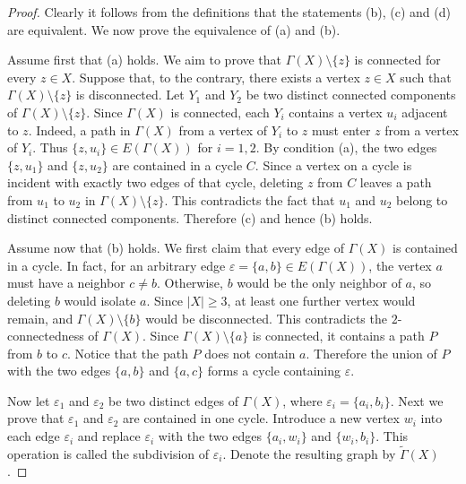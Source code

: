 \documentclass[reqno]{amsart}
\numberwithin{equation}{section}
\theoremstyle{plain}
\theoremstyle{definition}
\begin{document}
\begin{proof}
Clearly it follows from the definitions that the statements (b), (c) and (d) are equivalent.
We now prove the equivalence of (a) and (b).

Assume first that (a) holds. We aim to prove that
$\Gamma(X)\setminus\{z\}$ is connected for every $z\in X$.
Suppose that, to the contrary, there exists a vertex $z\in X$ such that
$\Gamma(X)\setminus\{z\}$ is disconnected. Let $Y_1$ and $Y_2$ be two
distinct connected components of $\Gamma(X)\setminus\{z\}$. Since $\Gamma(X)$ is
connected, each $Y_i$ contains a vertex $u_i$ adjacent to $z$.
Indeed, a path in $\Gamma(X)$ from a vertex of $Y_i$ to $z$ must enter $z$
from a vertex of $Y_i$. Thus $\{z,u_i\}\in E(\Gamma(X))$ for $i=1,2$.
By condition (a), the two edges $\{z,u_1\}$ and
$\{z,u_2\}$ are contained in a cycle $C$. Since a vertex on a
cycle is incident with exactly two edges of that cycle,
deleting $z$ from $C$ leaves a path from $u_1$ to $u_2$ in
$\Gamma(X)\setminus\{z\}$. This contradicts the fact that $u_1$ and $u_2$
belong to distinct connected components.
Therefore (c) and hence (b) holds.

Assume now that (b) holds. We first claim that every edge of $\Gamma(X)$ is contained
in a cycle. In fact, for an arbitrary edge $\varepsilon=\{a,b\}\in E(\Gamma(X))$, the vertex
$a$ must have a neighbor $c\neq b$. Otherwise, $b$ would be the
only neighbor of $a$, so deleting $b$ would isolate $a$. Since
$|X|\geq 3$, at least one further vertex would remain, and
$\Gamma(X)\setminus\{b\}$ would be disconnected. This contradicts the
$2$-connectedness of $\Gamma(X)$.
Since $\Gamma(X)\setminus\{a\}$ is connected, it contains a path
$P$ from $b$ to $c$. Notice that the path $P$ does not contain $a$. Therefore
the union of $P$ with the two edges $\{a,b\}$ and $\{a,c\}$ forms a
cycle containing $\varepsilon$.

Now let $\varepsilon_1$ and $\varepsilon_2$ be two distinct edges
of $\Gamma(X)$, where $\varepsilon_i=\{a_i,b_i\}$. Next we prove that
$\varepsilon_1$ and $\varepsilon_2$ are contained in one cycle.
Introduce a new vertex $w_i$ into each edge $\varepsilon_i$ and replace $\varepsilon_i$
with the two edges $\{a_i,w_i\}$ and $\{w_i,b_i\}$.
This operation is called the subdivision of $\varepsilon_i$.
Denote the resulting graph by $\widetilde \Gamma(X)$.


\end{proof}
\end{document}
